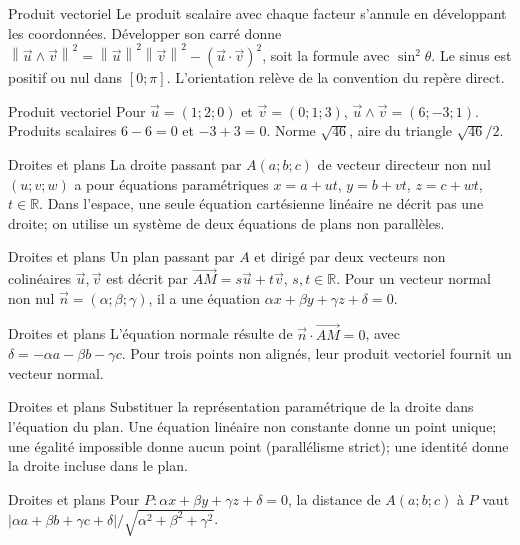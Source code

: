 \documentclass[aspectratio=169,10pt]{beamer}
\begin{document}
\begin{frame}{Produit vectoriel}
Le produit scalaire avec chaque facteur s’annule en développant les coordonnées. Développer son carré donne \(\left\| \overrightarrow{u}\wedge\overrightarrow{v} \right\|^2=\left\| \overrightarrow{u} \right\|^2\left\| \overrightarrow{v} \right\|^2-(\overrightarrow{u}\cdot\overrightarrow{v})^2\), soit la formule avec \(\sin^2\theta\). Le sinus est positif ou nul dans \([0;\pi]\). L’orientation relève de la convention du repère direct.
\end{frame}
\begin{frame}{Produit vectoriel}
Pour \(\overrightarrow{u}=(1;2;0)\) et \(\overrightarrow{v}=(0;1;3)\), \(\overrightarrow{u}\wedge\overrightarrow{v}=(6;-3;1)\). Produits scalaires \(6-6=0\) et \(-3+3=0\). Norme \(\sqrt{46}\), aire du triangle \(\sqrt{46}/2\).
\end{frame}
\begin{frame}{Droites et plans}
La droite passant par \(A(a;b;c)\) de vecteur directeur non nul \((u;v;w)\) a pour équations paramétriques \(x=a+ut\), \(y=b+vt\), \(z=c+wt\), \(t\in\mathbb{R}\). Dans l’espace, une seule équation cartésienne linéaire ne décrit pas une droite; on utilise un système de deux équations de plans non parallèles.
\end{frame}
\begin{frame}{Droites et plans}
Un plan passant par \(A\) et dirigé par deux vecteurs non colinéaires \(\overrightarrow{u},\overrightarrow{v}\) est décrit par \(\overrightarrow{AM}=s\overrightarrow{u}+t\overrightarrow{v}\), \(s,t\in\mathbb{R}\). Pour un vecteur normal non nul \(\overrightarrow{n}=(\alpha;\beta;\gamma)\), il a une équation \(\alpha x+\beta y+\gamma z+\delta=0\).
\end{frame}
\begin{frame}{Droites et plans}
L’équation normale résulte de \(\overrightarrow{n}\cdot\overrightarrow{AM}=0\), avec \(\delta=-\alpha a-\beta b-\gamma c\). Pour trois points non alignés, leur produit vectoriel fournit un vecteur normal.
\end{frame}
\begin{frame}{Droites et plans}
Substituer la représentation paramétrique de la droite dans l’équation du plan. Une équation linéaire non constante donne un point unique; une égalité impossible donne aucun point (parallélisme strict); une identité donne la droite incluse dans le plan.
\end{frame}
\begin{frame}{Droites et plans}
Pour \(P:\alpha x+\beta y+\gamma z+\delta=0\), la distance de \(A(a;b;c)\) à \(P\) vaut \(|\alpha a+\beta b+\gamma c+\delta|/\sqrt{\alpha^2+\beta^2+\gamma^2}\).
\end{frame}
\end{document}
